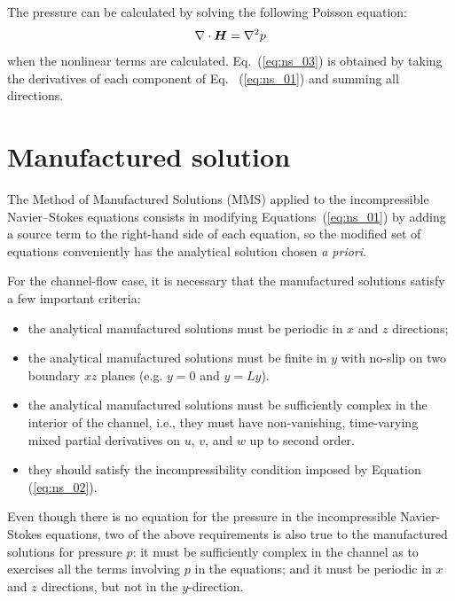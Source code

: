 \documentclass[10pt]{article}
\newcommand{\bv}[1]{\ensuremath{\mbox{\boldmath$ #1 $}}}
\begin{document}
The pressure can be calculated by solving the following Poisson equation:
\begin{equation}
\label{eq:ns_03}
\nabla \cdot \bv{H} = \nabla^2 p 
\end{equation}
when the nonlinear terms are calculated. Eq.~(\ref{eq:ns_03}) is obtained by taking the derivatives of each component of Eq.~ (\ref{eq:ns_01}) and summing all directions.

\section{Manufactured solution}

The Method of Manufactured Solutions (MMS) applied to the incompressible Navier--Stokes equations consists in modifying Equations~(\ref{eq:ns_01}) by adding a source term to the right-hand side of each equation, so the modified set of equations conveniently has the analytical solution chosen \textit{a priori}.

For the channel-flow case, it is necessary that the manufactured solutions satisfy a few important criteria:
\begin{itemize}
\item the analytical manufactured solutions must be periodic in $x$ and $z$ directions;
\item the analytical manufactured solutions must be finite in $y$ with no-slip on two boundary $xz$ planes (e.g. $y=0$ and $y=Ly$).
\item the analytical manufactured solutions must be sufficiently complex in the interior of the channel, i.e., they must have non-vanishing, time-varying mixed partial derivatives on $u$, $v$, and $w$ up to second order.
\item they should satisfy the incompressibility condition imposed by Equation (\ref{eq:ns_02}).
\end{itemize}

Even though there is no equation for the pressure in the incompressible Navier-Stokes equations, two of the above requirements is also true to the manufactured solutions for pressure $p$: it must be sufficiently complex in the channel as to exercises all the terms involving $p$ in the equations; and it must be periodic in $x$ and $z$ directions, but not in the $y$-direction. 


\end{document}
